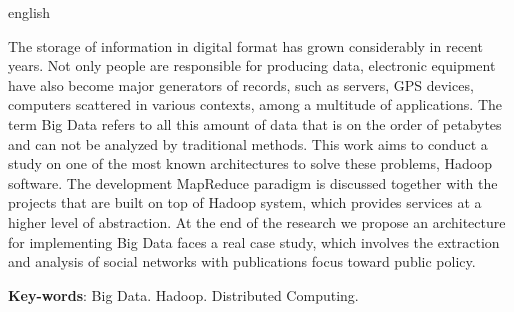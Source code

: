 \begin{resumo}[Abstract]
 \begin{otherlanguage*}{english}

The storage of information in digital format has grown considerably in recent years. Not only people are responsible for producing data, electronic equipment have also become major generators of records, such as servers, GPS devices, computers scattered in various contexts, among a multitude of applications. The term Big Data refers to all this amount of data that is on the order of petabytes and can not be analyzed by traditional methods. This work aims to conduct a study on one of the most known architectures to solve these problems, Hadoop software. The development MapReduce paradigm is discussed together with the projects that are built on top of Hadoop system, which provides services at a higher level of abstraction. At the end of the research we propose an architecture for implementing Big Data faces a real case study, which involves the extraction and analysis of social networks with publications focus toward public policy.

   \vspace{\onelineskip}
 
   \noindent 
   \textbf{Key-words}: Big Data. Hadoop. Distributed Computing.
 \end{otherlanguage*}
\end{resumo}
